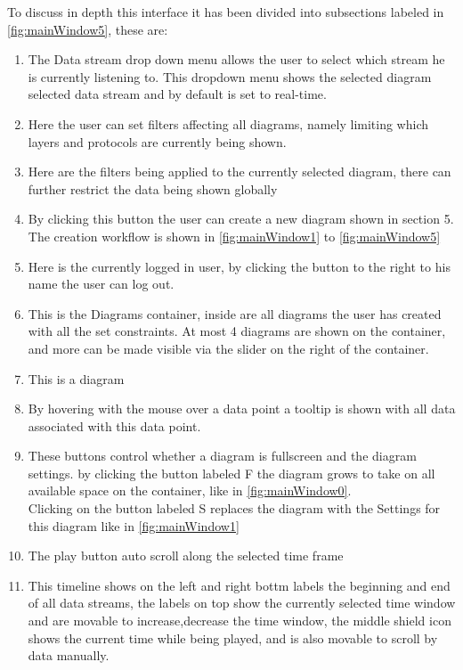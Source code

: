 \documentclass[twoside, english, draft]{Pflichtenheft}
\begin{document}
To discuss in depth this interface it has been divided into subsections labeled in \autoref{fig:mainWindow5}, these are:
\\
\begin{enumerate}
\item The Data stream drop down menu allows the user to select which stream he is currently listening to. This dropdown menu shows the selected diagram selected data stream and by default is set to real-time.
\item Here the user can set filters affecting all diagrams, namely limiting which layers and protocols are currently being shown.
\item Here are the filters being applied to the currently selected diagram, there can further restrict the data being shown globally
\item By clicking this button the user can create a new diagram shown in section 5. The creation workflow is shown in \autoref{fig:mainWindow1} to \autoref{fig:mainWindow5}
\item Here is the currently logged in user, by clicking the button to the right to his name the user can log out.
\item This is the Diagrams container, inside are all diagrams the user has created with all the set constraints. At most 4 diagrams are shown on the container, and more can be made visible via the slider on the right of the container.
\item This is a diagram
\item By hovering with the mouse over a data point a tooltip is shown with all data associated with this data point.
\item These buttons control whether a diagram is fullscreen and the diagram settings. by clicking the button labeled F the diagram grows to take on all available space on the container, like in \autoref{fig:mainWindow0}.
\\
Clicking on the button labeled S replaces the diagram with the Settings for this diagram like in \autoref{fig:mainWindow1}
\item The play button auto scroll along the selected time frame
\item This timeline shows on the left and right bottm labels the beginning and end of all data streams, the labels on top show the currently selected time window and are movable to increase,decrease the time window, the middle shield icon shows the current time while being played, and is also movable to scroll by data manually.

\end{enumerate}
\end{document}
